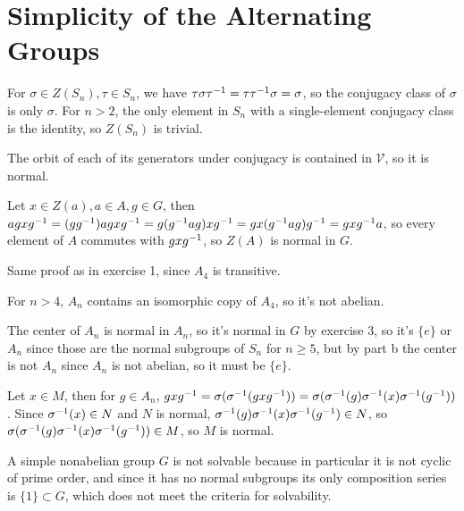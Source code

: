 \documentclass[11pt, oneside]{article}   	%
\begin{document}
\section{Simplicity of the Alternating Groups}
\be
\item For $\sigma \in Z(S_n), \tau \in S_n$, we have $\tau\sigma\tau^{-1} = \tau\tau^{-1}\sigma = \sigma$, so the conjugacy class of $\sigma$ is only $\sigma$. For $n > 2$, the only element in $S_n$ with a single-element conjugacy class is the identity, so $Z(S_n)$ is trivial.
\item The orbit of each of its generators under conjugacy is contained in $\mathcal{V}$, so it is normal.
\item Let $x \in Z(a), a \in A, g \in G$, then $agxg^{-1} = (gg^{-1})agxg^{-1} = g(g^{-1} ag)xg^{-1} = gx(g^{-1} ag)g^{-1} = gxg^{-1} a$, so every element of $A$ commutes with $gxg^{-1}$, so $Z(A)$ is normal in $G$.
\item \be
\item Same proof as in exercise 1, since $A_4$ is transitive.
\item For $n > 4$, $A_n$ contains an isomorphic copy of $A_4$, so it's not abelian.
\item The center of $A_n$ is normal in $A_n$, so it's normal in $G$ by exercise 3, so it's $\{e\}$ or $A_n$ since those are the normal subgroups of $S_n$ for $n \ge 5$, but by part b the center is not $A_n$ since $A_n$ is not abelian, so it must be $\{e\}$.
\ee
\item Let $x\in M$, then for $g \in A_n$, $gxg^{-1} = \sigma(\sigma^{-1}(gxg^{-1})) = \sigma(\sigma^{-1}(g)\sigma^{-1}(x)\sigma^{-1}(g^{-1}))$. Since $\sigma^{-1}(x) \in N$ and $N$ is normal, $\sigma^{-1}(g)\sigma^{-1}(x)\sigma^{-1}(g^{-1}) \in N$, so  $ \sigma(\sigma^{-1}(g)\sigma^{-1}(x)\sigma^{-1}(g^{-1})) \in M$, so $M$ is normal.
\item A simple nonabelian group $G$ is not solvable because in particular it is not cyclic of prime order, and since it has no normal subgroups its only composition series is $\{1\} \subset G$, which does not meet the criteria for solvability.
\ee
\end{document}
